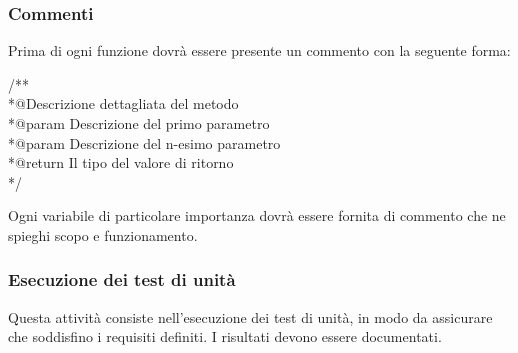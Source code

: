 \subsubsection{Commenti}

Prima di ogni funzione dovrà essere presente un commento con la seguente forma:

\begin{flushleft}
	/**\\
	 *@Descrizione dettagliata del metodo\\
	 *@param Descrizione del primo parametro\\
	 *@param Descrizione del n-esimo parametro\\
	 *@return Il tipo del valore di ritorno\\
	*/
\end{flushleft}

Ogni variabile di particolare importanza dovrà essere fornita di commento che ne spieghi scopo e funzionamento.

\subsubsection{Esecuzione dei test di unità}
Questa attività consiste nell'esecuzione dei test di unità, in modo da assicurare che soddisfino i requisiti definiti. I risultati devono essere documentati.


